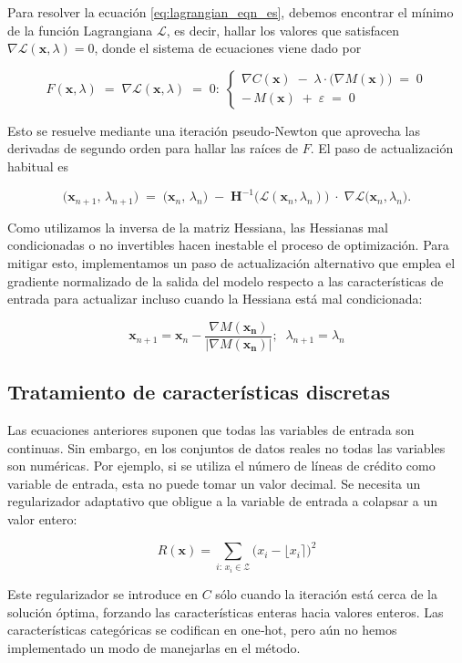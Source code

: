 \documentclass[12pt]{extarticle}
\numberwithin{equation}{section}
\begin{document}
Para resolver la ecuación \ref{eq:lagrangian_eqn_es}, debemos encontrar el mínimo de la función Lagrangiana $\mathcal{L}$, es decir, hallar los valores que satisfacen $\nabla \mathcal{L}(\mathbf{x}, \lambda) = 0$, donde el sistema de ecuaciones viene dado por

\[
F(\mathbf{x}, \lambda) \;=\; \nabla \mathcal{L}(\mathbf{x}, \lambda) \;=\; 0:\;
\begin{cases}
\nabla C(\mathbf{x}) \; -\; \lambda \cdot \bigl(\nabla M(\mathbf{x})\bigr) \;=\; 0 \\
-\,M(\mathbf{x})\;+\;\varepsilon\;=\;0
\end{cases}
\]

Esto se resuelve mediante una iteración pseudo‑Newton que aprovecha las derivadas de segundo orden para hallar las raíces de $F$. El paso de actualización habitual es

\[
\bigl(\mathbf{x}_{n+1},\,\lambda_{n+1}\bigr)
\;=\;
\bigl(\mathbf{x}_n,\,\lambda_n\bigr)
\; -\;
\mathbf{H}^{-1}\!\bigl(\mathcal{L}(\mathbf{x}_n,\lambda_n)\bigr)
\;\cdot\;
\nabla\mathcal{L}\bigl(\mathbf{x}_n,\lambda_n\bigr).
\]

Como utilizamos la inversa de la matriz Hessiana, las Hessianas mal condicionadas o no invertibles hacen inestable el proceso de optimización. Para mitigar esto, implementamos un paso de actualización alternativo que emplea el gradiente normalizado de la salida del modelo respecto a las características de entrada para actualizar incluso cuando la Hessiana está mal condicionada:

\[
\mathbf{x}_{n+1} = \mathbf{x}_n - \frac{\nabla M(\mathbf{x_n})}{|\nabla M(\mathbf{x_n})|};\;\;
    \lambda_{n+1} = \lambda_n
\]

\subsection*{Tratamiento de características discretas}
Las ecuaciones anteriores suponen que todas las variables de entrada son continuas. Sin embargo, en los conjuntos de datos reales no todas las variables son numéricas. Por ejemplo, si se utiliza el número de líneas de crédito como variable de entrada, esta no puede tomar un valor decimal. Se necesita un regularizador adaptativo que obligue a la variable de entrada a colapsar a un valor entero:

\[
R(\mathbf{x})=\sum_{i:\, x_i\in \mathcal{Z}}\bigl(x_i-\lfloor x_i\rceil\bigr)^2
\]

Este regularizador se introduce en $C$ sólo cuando la iteración está cerca de la solución óptima, forzando las características enteras hacia valores enteros. Las características categóricas se codifican en one‑hot, pero aún no hemos implementado un modo de manejarlas en el método.
\end{document}
